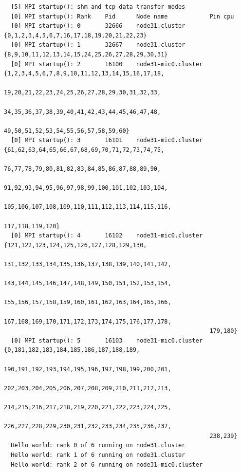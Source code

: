 \documentclass[pscyr,10pt]{hedlab}
\begin{document}
\begin{lstlisting}
  [5] MPI startup(): shm and tcp data transfer modes
  [0] MPI startup(): Rank    Pid      Node name            Pin cpu
  [0] MPI startup(): 0       32666    node31.cluster       {0,1,2,3,4,5,6,7,16,17,18,19,20,21,22,23}
  [0] MPI startup(): 1       32667    node31.cluster       {8,9,10,11,12,13,14,15,24,25,26,27,28,29,30,31}
  [0] MPI startup(): 2       16100    node31-mic0.cluster  {1,2,3,4,5,6,7,8,9,10,11,12,13,14,15,16,17,18,
                                                           19,20,21,22,23,24,25,26,27,28,29,30,31,32,33,
                                                           34,35,36,37,38,39,40,41,42,43,44,45,46,47,48,
                                                           49,50,51,52,53,54,55,56,57,58,59,60}
  [0] MPI startup(): 3       16101    node31-mic0.cluster  {61,62,63,64,65,66,67,68,69,70,71,72,73,74,75,
                                                           76,77,78,79,80,81,82,83,84,85,86,87,88,89,90,
                                                           91,92,93,94,95,96,97,98,99,100,101,102,103,104,
                                                           105,106,107,108,109,110,111,112,113,114,115,116,
                                                           117,118,119,120}
  [0] MPI startup(): 4       16102    node31-mic0.cluster  {121,122,123,124,125,126,127,128,129,130,
                                                           131,132,133,134,135,136,137,138,139,140,141,142,
                                                           143,144,145,146,147,148,149,150,151,152,153,154,
                                                           155,156,157,158,159,160,161,162,163,164,165,166,
                                                           167,168,169,170,171,172,173,174,175,176,177,178,
                                                           179,180}
  [0] MPI startup(): 5       16103    node31-mic0.cluster  {0,181,182,183,184,185,186,187,188,189,
                                                           190,191,192,193,194,195,196,197,198,199,200,201,
                                                           202,203,204,205,206,207,208,209,210,211,212,213,
                                                           214,215,216,217,218,219,220,221,222,223,224,225,
                                                           226,227,228,229,230,231,232,233,234,235,236,237,
                                                           238,239}
  Hello world: rank 0 of 6 running on node31.cluster
  Hello world: rank 1 of 6 running on node31.cluster
  Hello world: rank 2 of 6 running on node31-mic0.cluster

\end{lstlisting}
\end{document}
